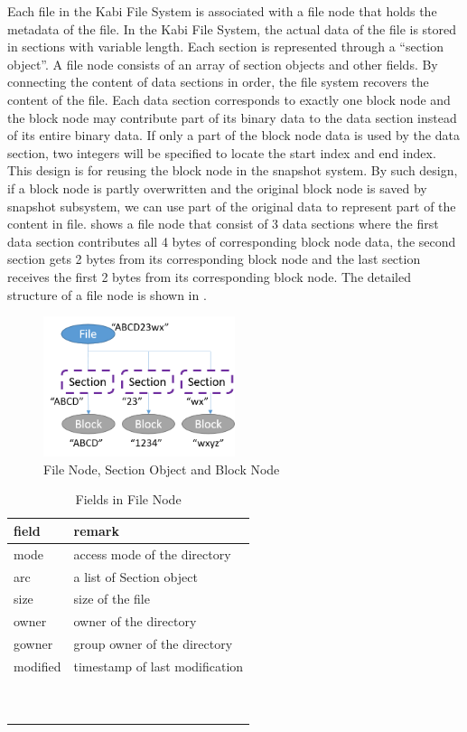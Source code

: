     Each file in the Kabi File System is associated with a file node that holds the metadata of the file. In the Kabi File System, the actual data of the file is stored in sections with variable length. Each section is represented through a ``section object''. A file node consists of an array of section objects and other fields. By connecting the content of data sections in order, the file system recovers the content of the file. Each data section corresponds to exactly one block node and the block node may contribute part of its binary data to the data section instead of its entire binary data. If only a part of the block node data is used by the data section, two integers will be specified to locate the start index and end index. This design is for reusing the block node in the snapshot system. By such design, if a block node is partly overwritten and the original block node is saved by snapshot subsystem, we can use part of the original data to represent part of the content in file.  shows a file node that consist of 3 data sections where the first data section contributes all 4 bytes of corresponding block node data, the second section gets 2 bytes from its corresponding block node and the last section receives the first 2 bytes from its corresponding block node. The detailed structure of a file node is shown in .

\begin{figure}[t]
\centering
\includegraphics[width=0.5\textwidth]{Chapter-3/figs/fig7.png}
\caption{File Node, Section Object and Block Node}
\label{fig:file_and_section}
\end{figure}


\begin{table}[t]
\begin{center}
\caption{Fields in File Node}
\begin{tabular}{ll}
\toprule
field & remark\\
\midrule
mode & access mode of the directory\\
arc & a list of Section object\\
size & size of the file\\
owner & owner of the directory\\
gowner & group owner of the directory\\
modified & timestamp of last modification\\
\bottomrule
~\\
~\\
\end{tabular}
\end{center}
\label{tab:file_fields}
\end{table}


